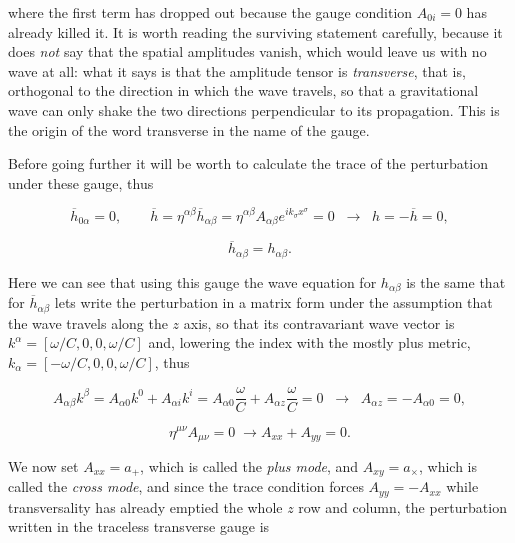         where the first term has dropped out because the gauge condition $A_{0i}=0$ has already killed it. It is worth reading the surviving statement carefully, because it does \textit{not} say that the spatial amplitudes vanish, which would leave us with no wave at all: what it says is that the amplitude tensor is \textit{transverse}, that is, orthogonal to the direction in which the wave travels, so that a gravitational wave can only shake the two directions perpendicular to its propagation. This is the origin of the word transverse in the name of the gauge.

        Before going further it will be worth to calculate the trace of the perturbation under these gauge, thus

        \begin{equation}
            \overline{h}_{0\alpha}=0,\qquad \overline{h}=\eta^{\alpha\beta}\overline{h}_{\alpha\beta} = \eta^{\alpha\beta}A_{\alpha\beta}e^{ik_{\sigma}x^{\sigma}}=0 \;\;\longrightarrow\;\; h = -\overline{h} = 0,
        \end{equation}

        \begin{equation}
            \overline{h}_{\alpha\beta}=h_{\alpha\beta}.
        \end{equation}

        Here we can see that using this gauge the wave equation for $h_{\alpha\beta}$ is the same that for $\overline{h}_{\alpha\beta}$ lets write the perturbation in a matrix form under the assumption that the wave travels along the $z$ axis, so that its contravariant wave vector is $k^{\alpha} = [\omega/C,0,0,\omega/C]$ and, lowering the index with the mostly plus metric, $k_{\alpha} = [-\omega/C,0,0,\omega/C]$, thus

        \begin{equation}
            A_{\alpha\beta}k^{\beta} = A_{\alpha 0}k^0 + A_{\alpha i}k^i = A_{\alpha 0}\frac{\omega}{C} + A_{\alpha z}\frac{\omega}{C}=0 \;\;\longrightarrow\;\; A_{\alpha z} = -A_{\alpha 0} = 0,
        \end{equation}

        \begin{equation}
            \eta^{\mu\nu}A_{\mu\nu}=0 \;\rightarrow A_{xx}+A_{yy}=0.
        \end{equation}

        We now set $A_{xx}=a_{+}$, which is called the \textit{plus mode}, and $A_{xy}=a_{\times}$, which is called the \textit{cross mode}, and since the trace condition forces $A_{yy}=-A_{xx}$ while transversality has already emptied the whole $z$ row and column, the perturbation written in the traceless transverse gauge is

